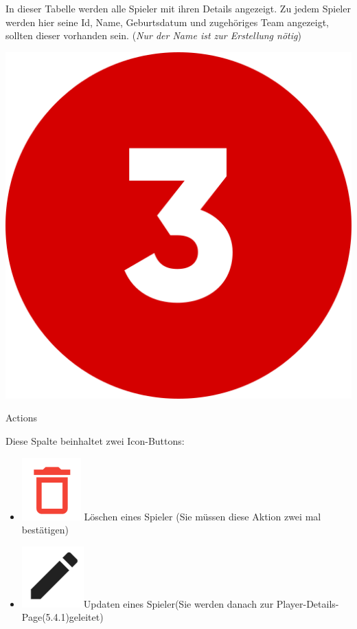 In dieser Tabelle werden alle Spieler mit ihren Details angezeigt. Zu jedem Spieler werden hier seine Id, Name, Geburtsdatum und zugehöriges Team angezeigt,
sollten dieser vorhanden sein. (\textit{Nur der Name ist zur Erstellung nötig})

\bigskip
\includegraphics[scale=0.05]{pics/user-guide/numbers/number-3.png} \begin{LARGE} Actions \end{LARGE}

Diese Spalte beinhaltet zwei Icon-Buttons:
\begin{itemize}
    \item \includegraphics[scale=0.3]{pics/user-guide/delete-icon.PNG} Löschen eines Spieler (Sie müssen diese Aktion zwei mal bestätigen)
    \item\includegraphics[scale=0.3]{pics/user-guide/edit-icon.PNG}Updaten eines Spieler(Sie werden danach zur Player-Details-Page(5.4.1)geleitet)
\end{itemize}
